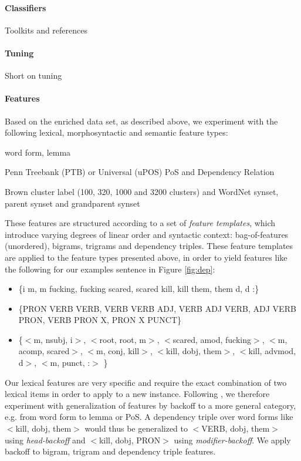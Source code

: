 \documentclass[11pt,letterpaper]{article}
\begin{document}
\paragraph{Classifiers}
Toolkits and references
\paragraph{Tuning}
Short on tuning
\paragraph{Features}
Based on the enriched data set, as described above, we experiment with the following lexical, morphosyntactic and semantic feature types:
\begin{description}
\setlength\itemsep{0em}
\item[Lexical] word form, lemma
\item[Morphosyntactic] Penn Treebank (PTB) or Universal (uPOS) PoS and Dependency Relation
\item[Semantic] Brown cluster label (100, 320, 1000 and 3200 clusters) and WordNet synset, parent synset and grandparent synset
\end{description}
These features are structured according to a set of \emph{feature
  templates}, which introduce varying degrees of linear order and
syntactic context: bag-of-features (unordered), bigrams, trigrams and
dependency triples. These feature templates are applied to the feature
types presented above, in order to yield features like the following
for our examples sentence in Figure \ref{fig:dep}:

\begin{itemize}
\setlength\itemsep{0em}
\item \{i m,  m fucking, fucking scared, scared kill, kill them,  them d,  d :\}

\item \{PRON VERB VERB, VERB VERB ADJ, VERB ADJ VERB, ADJ VERB PRON,  VERB PRON X,  PRON X PUNCT\}

\item \{$<$m, nsubj, i$>$, $<$root, root, m$>$, $<$scared, amod, fucking$>$, $<$m, acomp, scared$>$, $<$m, conj, kill$>$, $<$kill, dobj, them$>$, $<$kill, advmod, d$>$, $<$m, punct, :$>$ \}
\end{itemize}
Our lexical features are very specific and require the exact
combination of two lexical items in order to apply to a new instance.
Following , we therefore experiment with
generalization of features by backoff to a more general category,
e.g. from word form to lemma or PoS. A dependency triple over word
forms like $<$kill, dobj, them$>$ would thus be generalized to
$<$VERB, dobj, them$>$ using \emph{head-backoff} and $<$kill, dobj,
PRON$>$ using \emph{modifier-backoff}. We apply backoff to bigram,
trigram and dependency triple features.
\end{document}
